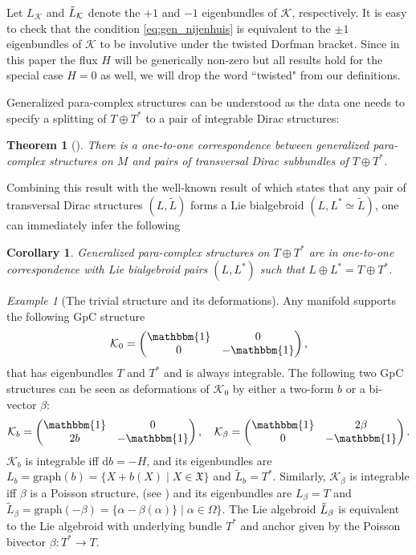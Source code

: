 \documentclass[letterpaper,12pt]{article}
\newcommand{\TT}{{T\oplus T^*}}
\newcommand{\KK}{\mathcal{K}}
\newcommand{\XX}{\mathfrak{X}}
\newcommand{\id}{\mathbbm{1}}
\newcommand{\ap}{\alpha}
\newcommand{\rd}{\mathrm{d}}
\newcommand{\Lt}{{\tl{L}}}
\def\tl{\tilde}
\newtheorem{corollary}[theorem]{Corollary}
\newtheorem*{theorem*}{Theorem}
\theoremstyle{definition}
\theoremstyle{remark}
\theoremstyle{examples}
\newtheorem{Ex}[theorem]{Example}
\begin{document}
Let $L_\KK$ and $\Tilde{L}_{\KK}$ denote the $+1$ and $-1$ eigenbundles of $\KK$, respectively. 
It is easy to check that the condition \eqref{eq:gen_nijenhuis} is equivalent to the $\pm 1$ eigenbundles of $\KK$ to be involutive under the twisted Dorfman bracket. Since in this paper the flux $H$ will be generically non-zero but all results hold for the special case $H=0$ as well, we will drop the word ``twisted" from our definitions.

Generalized para-complex structures can be understood as the data one needs to specify a splitting of $\TT$ to a pair of integrable Dirac structures:

\begin{theorem*}[\cite{wade2004dirac}]\label{thm:pairofdirac}
There is a one-to-one correspondence between generalized para-complex structures on $M$ and pairs of transversal Dirac subbundles of $\TT$.
\end{theorem*}

Combining this result with the well-known result of \cite{Liu:1995lsa} which states that any pair of transversal Dirac structures $(L,\Lt)$ forms a Lie bialgebroid $(L,L^*\simeq \Lt)$, one can immediately infer the following

\begin{corollary}
Generalized para-complex structures on $\TT$ are in one-to-one correspondence with Lie bialgebroid pairs $(L,L^*)$ such that $L\oplus L^*=\TT$. 
\end{corollary}


\begin{Ex}[The trivial structure and its deformations]\label{ex:GpC_trivial}
Any manifold supports the following GpC structure
\begin{align*}
\KK_0=
\begin{pmatrix}
\id & 0 \\
0 & -\id
\end{pmatrix},
\end{align*}
that has eigenbundles $T$ and $T^*$ and is always integrable. The following two GpC structures can be seen as deformations of $\KK_0$ by either a two-form $b$ or a bi-vector $\beta$:
\begin{align*}
\KK_b=
\begin{pmatrix}
\id & 0 \\
2b & -\id
\end{pmatrix},\quad
\KK_\beta=
\begin{pmatrix}
\id & 2\beta \\
0 & -\id
\end{pmatrix}.
\end{align*} 
$\KK_b$ is integrable iff $\rd b =-H$, and its eigenbundles are $L_{b} = \text{graph}(b)=\{X+b(X)\mid X \in \XX\}$ and $\widetilde{L}_b =T^*$. Similarly, $\KK_\beta$ is integrable iff $\beta$ is a Poisson structure, (see \cite[Lemma~2.13]{Hu:2019zro}) and its eigenbundles are $L_\beta =T$ and $\widetilde{L}_\beta =\text{graph}(-\beta)=\{\ap-\beta(\ap)\}\mid \ap \in \Omega\}$.
The Lie algebroid $\Tilde{L}_{\beta}$ is equivalent to the Lie algebroid with underlying bundle $T^*$ and anchor given by the Poisson bivector $\beta : T^* \to T$. 
\end{Ex}
\end{document}
